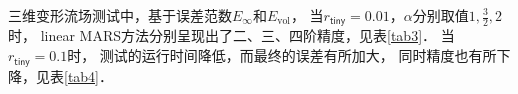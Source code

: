 三维变形流场测试中，基于误差范数$E_{\infty}$和$E_{\mathrm{vol}}$，
当$r_{\mathsf{tiny}}=0.01$，$\alpha$分别取值$1,\frac{3}{2},2$时，
linear MARS方法分别呈现出了二、三、四阶精度，见表\ref{tab3}．
当$r_{\mathsf{tiny}}=0.1$时，
测试的运行时间降低，而最终的误差有所加大，
同时精度也有所下降，见表\ref{tab4}．

\begin{figure}[htbp]
	\centering
	\hfill
	\hfill
	

\end{figure}
